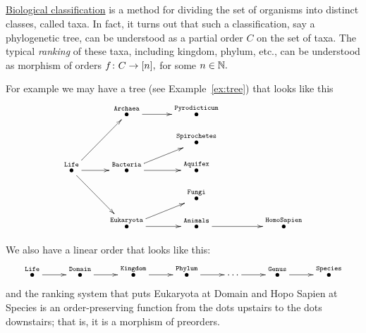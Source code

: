 \documentclass[CT4S-EN-RU]{subfiles}
\begin{document}
\begin{exerciseRUS}
\end{exerciseRUS}


\subsection{}


\subsubsection{}

\begin{blockENG}
\href{http://en.wikipedia.org/wiki/Biological_classification}{\text Biological classification} is a method for dividing the set of organisms into distinct classes, called taxa. In fact, it turns out that such a classification, say a phylogenetic tree, can be understood as a partial order $C$ on the set of taxa. The typical {\em ranking} of these taxa, including kingdom, phylum, etc., can be understood as morphism of orders $f\colon C\rightarrow [n],$ for some $n\in{\mathbb N}.$ 
\end{blockENG}

\begin{blockRUS}
\end{blockRUS}

\begin{blockENG}
For example we may have a tree (see Example~\ref{ex:tree}) that looks like this 
$$
\xymatrix@=10pt{
&&\LTO{Archaea}\ar[rr]&&\LTO{Pyrodicticum}\\
&&&&\LTO{Spirochetes}\\
\LTO{Life}\ar[rr]\ar[ddrr]\ar[uurr]&&\LTO{Bacteria}\ar[rr]\ar[rru]&&\LTO{Aquifex}\\
&&&&\LTO{Fungi}\\
&&\LTO{Eukaryota}\ar[rr]\ar[urr]&&\LTO{Animals}\ar[rrr]&&&\LTO{Homo Sapien}}
$$
\end{blockENG}

\begin{blockRUS}
\end{blockRUS}

\begin{blockENG}
We also have a linear order that looks like this:
$$
\xymatrix{\LTO{Life}\ar[r]&\LTO{Domain}\ar[r]&\LTO{Kingdom}\ar[r]&\LTO{Phylum}\ar[r]&\cdots\ar[r]&\LTO{Genus}\ar[r]&\LTO{Species}}
$$
and the ranking system that puts Eukaryota at Domain and Hopo Sapien at Species is an order-preserving function from the dots upstairs to the dots downstairs; that is, it is a morphism of preorders.
\end{blockENG}
\end{document}
